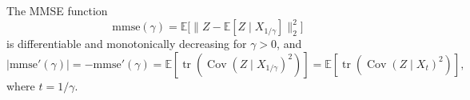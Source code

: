 \documentclass[10pt,a4paper]{amsart}
\begin{document}
\begin{proposition}
\label{prop:mmse-deriv-cov}

The MMSE function
\[
\mathrm{mmse}(\gamma)=\mathbb E\big[\|Z-\mathbb E[Z\mid X_{1/\gamma}]\|_2^2\big]
\]
is differentiable and monotonically decreasing for $\gamma>0$, and
\begin{equation}
|\mathrm{mmse}'(\gamma)|
=-\mathrm{mmse}'(\gamma)
=\mathbb E\!\left[
\operatorname{tr}\!\left(\operatorname{Cov}(Z\mid X_{1/\gamma})^2\right)
\right]
=\mathbb E\!\left[
\operatorname{tr}\!\left(\operatorname{Cov}(Z\mid X_t)^2\right)
\right],
\label{eq:mmse-deriv-cov}
\end{equation}
where $t=1/\gamma$.
\end{proposition}
\end{document}
